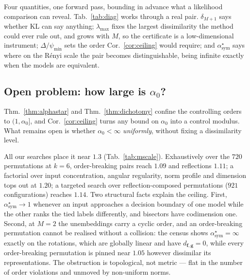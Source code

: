 \documentclass[10pt,letterpaper,twocolumn]{article}
\newcommand{\bff}{\mathbf{f}}
\newcommand{\bfg}{\mathbf{g}}
\newcommand{\dfg}{d_{\bff,\bfg}}
\theoremstyle{plain}
\theoremstyle{definition}
\theoremstyle{remark}
\begin{document}
Four quantities, one forward pass, bounding in advance what a likelihood
comparison can reveal. Tab.~\ref{tab:diag} works through a real pair. $\delta_{M+1}$ says whether KL can say anything;
$\lambda_{\max}$ fixes the largest dissimilarity the method could ever rule
out, and grows with $M$, so the certificate is a low-dimensional instrument;
$\Delta/\psi_{\min}$ sets the order Cor.~\ref{cor:ceiling} would require; and
$\alpha^{\star}_{\mathrm{sym}}$ says where on the R\'enyi scale the pair
becomes distinguishable, being infinite exactly when the models are equivalent.

\subsection{Open problem: how large is $\alpha_{0}$?}
\label{sec:open}

Thm.~\ref{thm:alphastar} and Thm.~\ref{thm:dichotomy} confine the controlling
orders to $(1,\alpha_{0}{]}$, and Cor.~\ref{cor:ceiling} turns any bound on
$\alpha_{0}$ into a control modulus. What remains open is whether
$\alpha_{0}<\infty$ \emph{uniformly}, without fixing a dissimilarity level.

All our searches place it near $1.3$ (Tab.~\ref{tab:mscale}). Exhaustively over
the $720$ permutations at $k=6$, order-breaking pairs reach $1.09$ and
reflections $1.11$; a factorial over input concentration, angular regularity,
norm profile and dimension tops out at $1.20$; a targeted search over
reflection-composed permutations ($921$ configurations) reaches $1.14$. Two
structural facts explain the ceiling. First,
$\alpha^{\star}_{\mathrm{sym}}\!\to\!1$ whenever an input approaches a decision
boundary of one model while the other ranks the tied labels differently, and
bisectors have codimension one. Second, at $M=2$ the unembeddings carry a
cyclic order, and an order-breaking permutation cannot be realised without a
collision: the census shows $\alpha^{\star}_{\mathrm{sym}}=\infty$ exactly on
the rotations, which are globally linear and have $\dfg=0$, while every
order-breaking permutation is pinned near $1.05$ however dissimilar its
representations. The obstruction is topological, not metric --- flat in the
number of order violations and unmoved by non-uniform norms.
\end{document}
